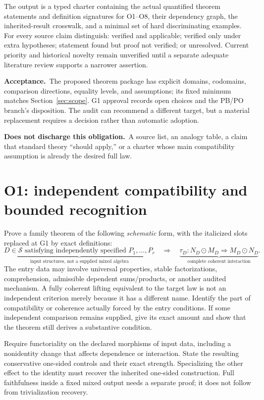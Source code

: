\documentclass[11pt,a4paper]{article}
\newcommand{\accept}{\par\textbf{Acceptance.}\ }
\newcommand{\notaccepted}{\par\textbf{Does not discharge this obligation.}\ }
\begin{document}
The output is a typed charter containing the actual quantified theorem
statements and definition signatures for O1--O8, their dependency graph,
the inherited-result crosswalk, and a minimal set of hard discriminating
examples. For every source claim distinguish: verified and applicable;
verified only under extra hypotheses; statement found but proof not verified;
or unresolved. Current priority and historical novelty remain unverified
until a separate adequate literature review supports a narrower assertion.

\accept The proposed theorem package has explicit domains, codomains,
comparison directions, equality levels, and assumptions; its fixed minimum
matches Section~\ref{sec:scope}. G1 approval records open choices and the
PB/PO branch's disposition. The audit can recommend a different target, but
a material replacement requires a decision rather than automatic adoption.

\notaccepted A source list, an analogy table, a claim that standard theory
``should apply,'' or a charter whose main compatibility assumption is already
the desired full law.

\section{O1: independent compatibility and bounded recognition}\label{sec:o1}

Prove a family theorem of the following \emph{schematic} form, with the
italicized slots replaced at G1 by exact definitions:
\[
 \underbrace{D\in\mathcal S\text{ satisfying independently specified }
 P_1,\ldots,P_r}_{\text{input structures, not a supplied mixed algebra}}
 \quad\Longrightarrow\quad
 \underbrace{\tau_D:N_D\odot M_D\Rightarrow M_D\odot N_D}_{
 \text{complete coherent interaction}}.
\]
The entry data may involve universal properties, stable factorizations,
comprehension, admissible dependent sums/products, or another audited
mechanism. A fully coherent lifting equivalent to the target law is not an
independent criterion merely because it has a different name. Identify the
part of compatibility or coherence actually forced by the entry conditions.
If some independent comparison remains supplied, give its exact amount and
show that the theorem still derives a substantive condition.

Require functoriality on the declared morphisms of input data, including a
nonidentity change that affects dependence or interaction. State the
resulting conservative one-sided controls and their exact strength.
Specializing the other effect to the identity must recover the inherited
one-sided construction. Full faithfulness inside a fixed mixed output needs
a separate proof; it does not follow from trivialization recovery.
\end{document}
